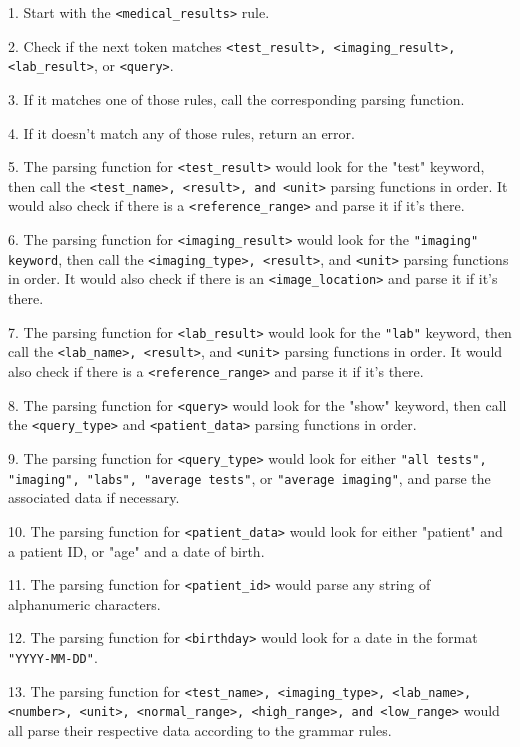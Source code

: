 1. Start with the \texttt{<medical\_results>} rule.

2. Check if the next token matches \texttt{<test\_result>, <imaging\_result>, <lab\_result>}, or \texttt{<query>}.

3. If it matches one of those rules, call the corresponding parsing function.

4. If it doesn't match any of those rules, return an error.

5. The parsing function for \texttt{<test\_result>} would look for the "test" keyword, then call the \texttt{<test\_name>, <result>, and <unit>} parsing functions in order. It would also check if there is a \texttt{<reference\_range>} and parse it if it's there.

6. The parsing function for \texttt{<imaging\_result>} would look for the \texttt{"imaging" keyword}, then call the \texttt{<imaging\_type>, <result>}, and \texttt{<unit>} parsing functions in order. It would also check if there is an \texttt{<image\_location>} and parse it if it's there.

7. The parsing function for \texttt{<lab\_result>} would look for the \texttt{"lab"} keyword, then call the \texttt{<lab\_name>, <result>}, and \texttt{<unit>} parsing functions in order. It would also check if there is a \texttt{<reference\_range>} and parse it if it's there.

8. The parsing function for \texttt{<query>} would look for the "show" keyword, then call the \texttt{<query\_type>} and \texttt{<patient\_data>} parsing functions in order.

9. The parsing function for \texttt{<query\_type>} would look for either \texttt{"all tests", "imaging", "labs", "average tests"}, or \texttt{"average imaging"}, and parse the associated data if necessary.

10. The parsing function for \texttt{<patient\_data>} would look for either "patient" and a patient ID, or "age" and a date of birth.

11. The parsing function for \texttt{<patient\_id>} would parse any string of alphanumeric characters.

12. The parsing function for \texttt{<birthday>} would look for a date in the format \texttt{"YYYY-MM-DD"}.

13. The parsing function for \texttt{<test\_name>, <imaging\_type>, <lab\_name>, <number>, <unit>, <normal\_range>, <high\_range>, and <low\_range>} would all parse their respective data according to the grammar rules.

